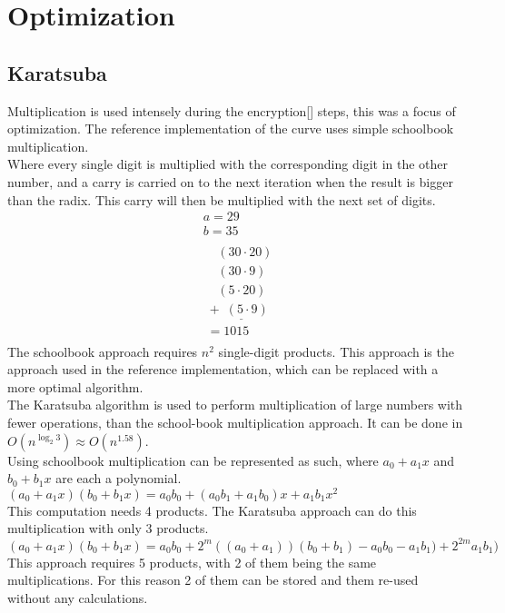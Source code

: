 \section{Optimization}

\subsection{Karatsuba}
Multiplication is used intensely during the encryption[] steps, this was a focus of optimization. The reference implementation of the curve uses simple schoolbook multiplication.\\
Where every single digit is multiplied with the corresponding digit in the other number, and a carry is carried on to the next iteration when the result is bigger than the radix. This carry will then be multiplied with the next set of digits.\\

\begin{equation*}
    \begin{split}
        & a = 29\\
        & b = 35\\
        \\
       &\;\;\;\;(30 \cdot 20)\\
       &\;\;\;\;(30 \cdot 9)\\
       &\;\;\;\;(5 \cdot 20)\\
       &\underline{\;+ \; (5 \cdot 9)\;\;\;}\\
       &\; = 1015\\
    \end{split}
\end{equation*}
The schoolbook approach requires $n^{2}$ single-digit products. 
This approach is the approach used in the reference implementation, which can be replaced with a more optimal algorithm.\medskip
\\
\label{karat-opti}The Karatsuba algorithm is used to perform multiplication of large numbers with fewer operations, than the school-book multiplication approach. It can be done in $O(n^{\log_{2}3}) \approx O(n^{1.58})$.\medskip
\\
Using schoolbook multiplication can be represented as such, where $a_0 + a_1x$ and $b_0 + b_1x$ are each a polynomial.\\
$(a_0 + a_1 x)(b_0 + b_1 x) = a_0 b_0 + (a_0 b_1 + a_1 b_0 )x + a_1 b_1 x^2$\\
This computation needs 4 products. The Karatsuba approach can do this multiplication with only 3 products.\\
$(a_0 + a_1 x)(b_0 + b_1 x) = a_0 b_0 + 2^m ((a_0+a_1))(b_0 + b_1)-a_0 b_0 - a_1 b_1) + 2^{2m} a_1 b_1)$\\
This approach requires 5 products, with 2 of them being the same multiplications. For this reason 2 of them can be stored and them re-used without any calculations.

